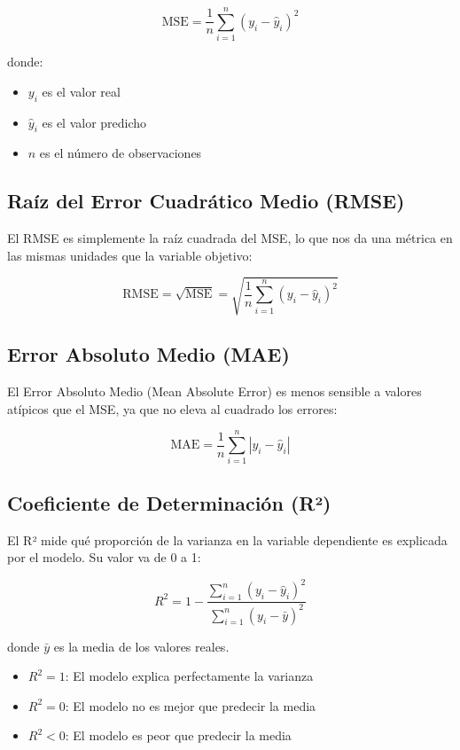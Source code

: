 \documentclass[12pt]{article}
\begin{document}
\[
\text{MSE} = \frac{1}{n} \sum_{i=1}^{n} {(y_i - \hat{y}_i)}^2
\]

donde:
\begin{itemize}
    \item $y_i$ es el valor real
    \item $\hat{y}_i$ es el valor predicho
    \item $n$ es el número de observaciones
\end{itemize}

\subsection{Raíz del Error Cuadrático Medio (RMSE)}

El RMSE es simplemente la raíz cuadrada del MSE, lo que nos da una métrica en las mismas unidades que la variable objetivo:

\[
\text{RMSE} = \sqrt{\text{MSE}} = \sqrt{\frac{1}{n} \sum_{i=1}^{n} {(y_i - \hat{y}_i)}^2}
\]

\subsection{Error Absoluto Medio (MAE)}

El Error Absoluto Medio (Mean Absolute Error) es menos sensible a valores atípicos que el MSE, ya que no eleva al cuadrado los errores:

\[
\text{MAE} = \frac{1}{n} \sum_{i=1}^{n} |y_i - \hat{y}_i|
\]

\subsection{Coeficiente de Determinación (R²)}

El R² mide qué proporción de la varianza en la variable dependiente es explicada por el modelo. Su valor va de 0 a 1:

\[
R^2 = 1 - \frac{\sum_{i=1}^{n} {(y_i - \hat{y}_i)}^2}{\sum_{i=1}^{n} {(y_i - \bar{y})}^2}
\]

donde $\bar{y}$ es la media de los valores reales.

\begin{itemize}
    \item $R^2 = 1$: El modelo explica perfectamente la varianza
    \item $R^2 = 0$: El modelo no es mejor que predecir la media
    \item $R^2 < 0$: El modelo es peor que predecir la media
\end{itemize}
\end{document}
